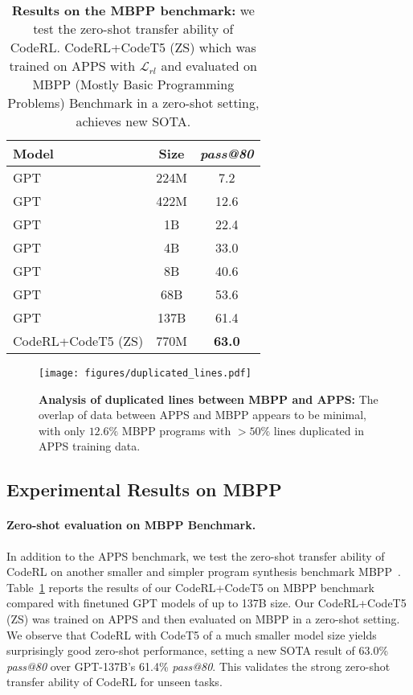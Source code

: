 \documentclass{article}
\begin{document}
\begin{table}[t] \centering
\caption{
\textbf{Results on the MBPP benchmark:}
we test the zero-shot transfer ability of CodeRL. 
CodeRL+CodeT5 (ZS) which was trained on APPS with $\mathcal{L}_{rl}$ and evaluated on MBPP (Mostly Basic Programming Problems) Benchmark \citep{austin2021program} in a zero-shot setting, achieves new SOTA. 
}
\label{tab:codet5_mpbb}
\begin{tabular}{lc|c}
\hline
Model & Size & \emph{pass@80} \\
\hline
GPT & 224M & 7.2 \\
GPT & 422M & 12.6 \\
GPT & 1B & 22.4 \\
GPT & 4B & 33.0 \\
GPT & 8B & 40.6 \\
GPT & 68B & 53.6 \\
GPT & 137B & 61.4 \\
\hline
CodeRL+CodeT5 (ZS) & 770M & \textbf{63.0} \\
\hline
\end{tabular}
\end{table} 
\begin{figure}[t]
	\centering
	\resizebox{1.0\textwidth}{!} {
	\texttt{[image: figures/duplicated\_lines.pdf]}
	}
	\caption{
	\textbf{Analysis of duplicated lines between MBPP and APPS:}
	The overlap of data between APPS and MBPP appears to be minimal, with only $12.6\%$ MBPP programs with $>50\%$ lines duplicated in APPS training data. 
}
	\label{fig:duplicated_lines}
\end{figure}

\subsection{Experimental Results on MBPP}
\label{subsec:mbpp}

\paragraph{Zero-shot evaluation on MBPP Benchmark.}
In addition to the APPS benchmark, we test the zero-shot transfer ability of CodeRL on another smaller and simpler program synthesis benchmark MBPP~\citep{austin2021program}. Table~\ref{tab:codet5_mpbb} reports the results of our CodeRL+CodeT5 on MBPP benchmark compared with finetuned GPT models of up to 137B size. Our CodeRL+CodeT5 (ZS) was trained on APPS and then evaluated on MBPP in a zero-shot setting. We observe that CodeRL with CodeT5 of a much smaller model size yields surprisingly good zero-shot performance, setting a new SOTA result of 63.0\% \emph{pass@80} over GPT-137B's 61.4\% \emph{pass@80}. This validates the strong zero-shot transfer ability of CodeRL for unseen tasks. 
\end{document}
